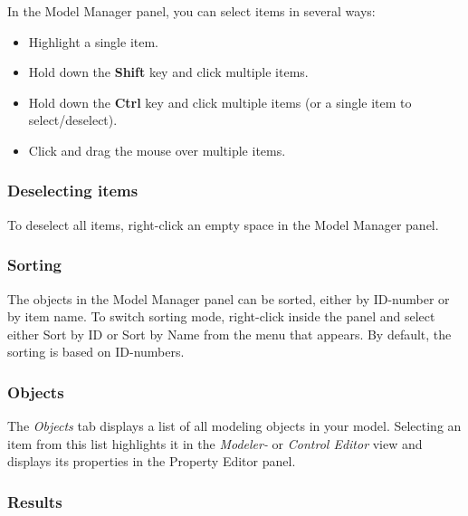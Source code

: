 
In the Model Manager panel, you can select items in several ways:

\begin{itemize}
\item Highlight a single item.
\item Hold down the \textbf{Shift} key and \newline click multiple items.
\end{itemize}

\begin{itemize}
\item Hold down the \textbf{Ctrl} key and click multiple items
  (or a single item to select/deselect).
\item Click and drag the mouse over multiple items.
\end{itemize}

\subsubsection{Deselecting items}

To deselect all items, right-click an empty space in the Model Manager panel.

\subsubsection{Sorting}

The objects in the Model Manager panel can be sorted, either by ID-number or
by item name. To switch sorting mode, right-click inside the panel and
select either Sort by ID or Sort by Name from the menu that appears.
By default, the sorting is based on ID-numbers.


\subsubsection{Objects}

The {\sl Objects} tab displays a list of all modeling objects in your
model. Selecting an item from this list highlights it in the
{\sl Modeler-} or {\sl Control Editor} view and displays its
properties in the Property Editor panel.

\subsubsection{Results}

